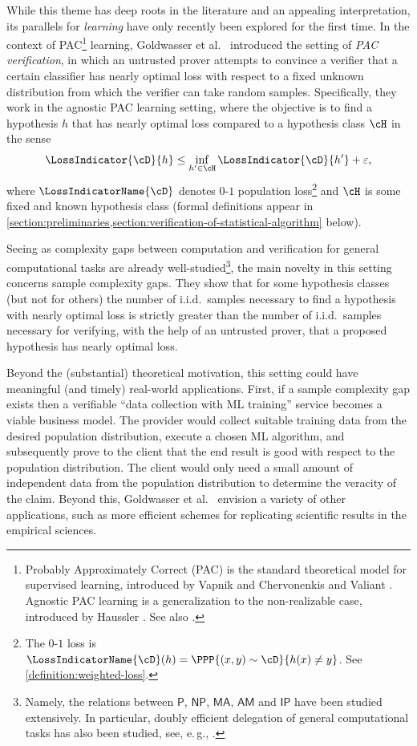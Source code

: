 \documentclass[11pt]{article}
\newcommand{\eg}{e.\,g.}
\begin{document}
While this theme has deep roots in the literature and an appealing interpretation, its parallels for \emph{learning} have only recently been explored for the first time. In the context of PAC\footnote{Probably Approximately Correct (PAC) is the standard theoretical model for supervised learning, introduced by Vapnik and Chervonenkis \cite{VapChe68} and Valiant \cite{Valiant84}. Agnostic PAC learning is a generalization to the non-realizable case, introduced by Haussler \cite{Haussler92}. See also \cite{0033642}.} learning, Goldwasser et al.\ \cite{GoldwasserRSY21} introduced the setting of \emph{PAC verification}, in which an untrusted prover attempts to convince a verifier that a certain classifier has %
%
nearly optimal %
loss with respect to a fixed unknown distribution from which the verifier can take random samples. Specifically, they work in the agnostic PAC learning setting, where the objective is to find a hypothesis $h$ that has nearly optimal loss compared to a hypothesis class $\cH$ in the sense 
\begin{equation}\label{eq:pac-learning}
	\LossIndicator{\cD}{h} \leq \inf_{h' \in \cH} \LossIndicator{\cD}{h'} + \varepsilon,
\end{equation}
where $\LossIndicatorName{\cD}$ denotes $0$-$1$ population loss\footnote{%
	The $0$-$1$ loss is $\LossIndicatorName{\cD}(h) = \PPP{(x,y) \sim \cD}{h(x) \neq y}$. See \cref{definition:weighted-loss}.%
} and $\cH$ is some fixed and known hypothesis class (formal definitions appear in \cref{section:preliminaries,section:verification-of-statistical-algorithm} below). 

Seeing as complexity gaps between computation and verification for general 
computational %
tasks %
are already well-studied\footnote{
  Namely, the relations between $\mathsf{P}$, $\mathsf{NP}$, $\mathsf{MA}$, $\mathsf{AM}$ and $\mathsf{IP}$ have been studied extensively. In particular, doubly efficient delegation of general computational tasks has also been studied,
%
see, \eg,  %
\cite{DBLP:journals/jacm/GoldwasserKR15}.
}, the main novelty in this setting concerns sample complexity gaps. They show that for some hypothesis classes (but not for others) the number of i.i.d.\ samples necessary to find a hypothesis with nearly optimal loss is strictly greater than the number of i.i.d.\ samples necessary for verifying, with the help of an untrusted prover, that a proposed hypothesis has nearly optimal loss.

Beyond the (substantial) theoretical motivation, this setting could have meaningful (and timely) real-world applications. First, if a sample complexity gap exists then a verifiable ``data collection with ML training'' service becomes a viable  business model. The provider would collect suitable training data from the desired population distribution, execute a chosen ML algorithm, and subsequently prove to the client that the end result is good with respect to the population distribution. The client would only need a small amount of independent data from the population distribution to determine the veracity of the claim. Beyond this, Goldwasser et al.\ \cite{GoldwasserRSY21} envision a variety of other applications, such as more efficient schemes for replicating scientific results in the empirical sciences.
\end{document}
